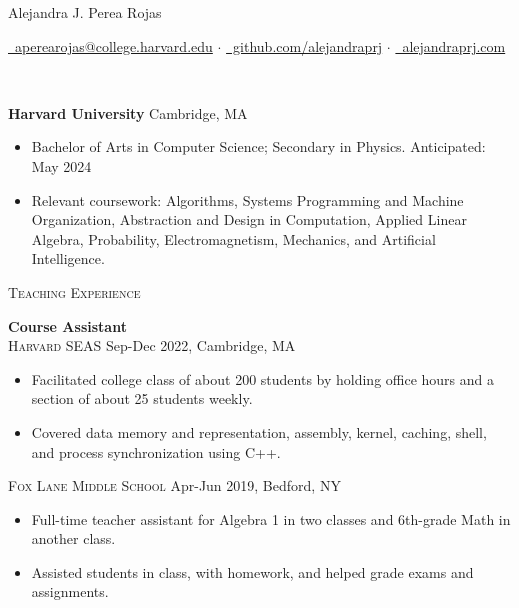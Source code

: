 \documentclass[11pt]{article}
\begin{document}
  \centerline{\Large{Alejandra J. Perea Rojas}}\vspace{1mm}

  \centerline{
    \href{mailto:aperearojas@college.harvard.edu}{\faEnvelopeO~aperearojas@college.harvard.edu} 
    $\cdot$ \href{https://github.com/alejandraprj}{\faGithub~github.com/alejandraprj}
    $\cdot$ \href{https://alejandraprj.com}{\faGlobe~alejandraprj.com}
  }\vspace{2mm}

  \vspace{-7pt}\\
  \noindent\makebox[\linewidth]{\rule{7.5in}{0.3pt}}

  \noindent \textbf{Harvard University} \hfill Cambridge, MA
    \begin{itemize}[itemsep=-.4em, leftmargin=1em]\vspace{-2mm}
        \item Bachelor of Arts in Computer Science; Secondary in Physics. \hfill Anticipated: May 2024
        \item Relevant coursework: 
          Algorithms, 
          Systems Programming and Machine Organization,
          Abstraction and Design in Computation, 
          Applied Linear Algebra, Probability,
          Electromagnetism, Mechanics, 
          and Artificial Intelligence.
    \end{itemize}

  \noindent\textsc{\large Teaching Experience}\vspace{-7pt}\\
  \noindent\makebox[\linewidth]{\rule{7.5in}{0.3pt}}
   
   \noindent\textbf{Course Assistant} \\
   \textsc{Harvard SEAS} \hfill Sep-Dec 2022, Cambridge, MA
   \begin{itemize}[itemsep=-.4em, leftmargin=1em]\vspace{-2mm}
    \item Facilitated college class of about 200 students by holding office hours and a section of about 25 students weekly.
    \item Covered data memory and representation, assembly, kernel, caching, shell, and process synchronization using C++.
   \end{itemize}\vspace{-1mm}
   \textsc{Fox Lane Middle School} \hfill Apr-Jun 2019, Bedford, NY
   \begin{itemize}[itemsep=-.4em, leftmargin=1em]\vspace{-2mm}
     \item Full-time teacher assistant for Algebra 1 in two classes and 6th-grade Math in another class. 
     \item Assisted students in class, with homework, and helped grade exams and assignments.
   \end{itemize}
\end{document}
